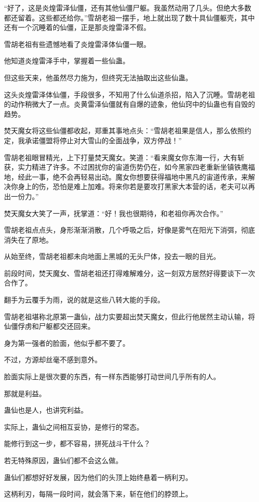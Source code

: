 \begin{this_body}
“好了，这是炎煌雷泽仙僵，还有其他仙僵尸躯。我虽然动用了几头。但绝大多数都还留着。这些都还给你。”雪胡老祖一摆手，地上就出现了数十具仙僵躯壳，其中还有一个沉睡着的仙僵，正是那炎煌雷泽不假。

雪胡老祖有些遗憾地看了炎煌雷泽体仙僵一眼。

他知道炎煌雷泽手中，掌握着一些仙蛊。

但这些天来，他虽然尽力施为，但终究无法抽取出这些仙蛊。

这头炎煌雷泽体仙僵，手段很多，不知用了什么仙道杀招，陷入了沉睡。雪胡老祖的动作稍微大了一点。炎黄雷泽仙僵就有自爆的迹象，他仙窍中的仙蛊也有自毁的趋势。

焚天魔女将这些仙僵都收起，郑重其事地点头：“雪胡老祖果是信人，那么依照约定，我承诺僵盟将停止对大雪山的全面战争，双方停战！”

雪胡老祖眼冒精光，上下打量焚天魔女。笑道：“看来魔女你东海一行，大有斩获，实力精进了许多。不过困扰你的宙道伤势仍在，如今黑家四老重新坐镇铁鹰福地，经此一事，绝不会再轻易出动。魔女你想要获得福地中黑凡的宙道传承，来解决你身上的伤，恐怕是难上加难。将来你若是要攻打黑家大本营的话，老夫可以再出一份力。”

焚天魔女大笑了一声，抚掌道：“好！我也很期待，和老祖你再次合作。”

雪胡老祖点点头，身形渐渐消散，几个呼吸之后，好像是雾气在阳光下消弭，彻底消失在了原地。

从始至终，雪胡老祖都未向地面上黑城的无头尸体，投去一眼的目光。

前段时间，焚天魔女、雪胡老祖还打得难解难分，这一刻双方居然好得要谈下一次合作了。

翻手为云覆手为雨，说的就是这些八转大能的手段。

雪胡老祖堪称北原第一蛊仙，战力实要超出焚天魔女，但此行他居然主动认输，将仙僵俘虏和尸躯都交还回来。

身为第一强者的脸面，他似乎都不要了。

不过，方源却丝毫不感到意外。

脸面实际上是很次要的东西，有一样东西能够打动世间几乎所有的人。

那就是利益。

蛊仙也是人，也讲究利益。

实际上，蛊仙之间相互妥协，是修行的常态。

能修行到这一步，都不容易，拼死战斗干什么？

若无特殊原因，蛊仙们都不会这么做。

蛊仙们都想好好发展，因为他们的头顶上始终悬着一柄利刃。

这柄利刃，每隔一段时间，就会落下来，斩在他们的脖颈上。


\end{this_body}
